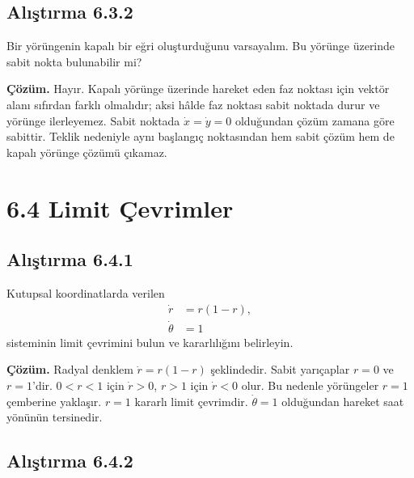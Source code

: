 \subsection*{Alıştırma 6.3.2}

\begin{justify}
Bir yörüngenin kapalı bir eğri oluşturduğunu varsayalım. Bu yörünge üzerinde sabit nokta bulunabilir mi?

\textbf{Çözüm.} Hayır. Kapalı yörünge üzerinde hareket eden faz noktası için vektör alanı sıfırdan farklı olmalıdır; aksi hâlde faz noktası sabit noktada durur ve yörünge ilerleyemez. Sabit noktada $\dot{x}=\dot{y}=0$ olduğundan çözüm zamana göre sabittir. Teklik nedeniyle aynı başlangıç noktasından hem sabit çözüm hem de kapalı yörünge çözümü çıkamaz.
\end{justify}

\section*{6.4 Limit Çevrimler}

\subsection*{Alıştırma 6.4.1}

\begin{justify}
Kutupsal koordinatlarda verilen
\begin{align}
\dot{r} &= r(1-r),\\
\dot{\theta} &= 1
\end{align}
sisteminin limit çevrimini bulun ve kararlılığını belirleyin.

\textbf{Çözüm.} Radyal denklem $\dot{r}=r(1-r)$ şeklindedir. Sabit yarıçaplar $r=0$ ve $r=1$'dir. $0<r<1$ için $\dot{r}>0$, $r>1$ için $\dot{r}<0$ olur. Bu nedenle yörüngeler $r=1$ çemberine yaklaşır. $r=1$ kararlı limit çevrimdir. $\dot{\theta}=1$ olduğundan hareket saat yönünün tersinedir.
\end{justify}

\subsection*{Alıştırma 6.4.2}

